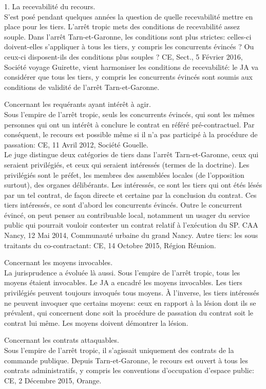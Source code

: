 \documentclass[10pt, a4paper, openany]{book}
\begin{document}
1. La recevabilité du recours. \\
S'est posé pendant quelques années la question de quelle recevabilité mettre en place pour les tiers. L'arrêt tropic mets des conditions de recevabilité assez souple. Dans l'arrêt Tarn-et-Garonne, les conditions sont plus strictes: celles-ci doivent-elles s'appliquer à tous les tiers, y compris les concurrents évincés ? Ou ceux-ci disposent-ils des conditions plus souples ? CE, Sect., 5 Février 2016, Société voyage Guirette, vient harmoniser les conditions de recevabilité: le JA va considérer que tous les tiers, y compris les concurrents évincés sont soumis aux conditions de validité de l'arrêt Tarn-et-Garonne.


Concernant les requérants ayant intérêt à agir. \\
Sous l'empire de l'arrêt tropic, seuls les concurrents évincés, qui sont les mêmes personnes qui ont un intérêt à conclure le contrat en référé pré-contractuel. Par conséquent, le recours est possible même si il n'a pas participé à la procédure de passation: CE, 11 Avril 2012, Société Gouelle. \\
Le juge distingue deux catégories de tiers dans l'arrêt Tarn-et-Garonne, ceux qui seraient privilégiés, et ceux qui seraient intéressés (termes de la doctrine). Les privilégiés sont le préfet, les membres des assemblées locales (de l'opposition surtout), des organes délibérants. Les intéressés, ce sont les tiers qui ont étés lésés par un tel contrat, de façon directe et certaine par la conclusion du contrat. Ces tiers intéressés, ce sont d'abord les concurrents évincés. Outre le concurrent évincé, on peut penser au contribuable local, notamment un usager du service public qui pourrait vouloir contester un contrat relatif à l'exécution du SP. CAA Nancy, 12 Mai 2014, Communauté urbaine du grand Nancy. Autre tiers: les sous traitants du co-contractant: CE, 14 Octobre 2015, Région Réunion. 


Concernant les moyens invocables. \\
La jurisprudence a évoluée là aussi. Sous l'empire de l'arrêt tropic, tous les moyens étaient invocables. Le JA a encadré les moyens invocables. Les tiers privilégiés peuvent toujours invoqués tous moyens. À l'inverse, les tiers intéressés ne peuvent invoquer que certains moyens: ceux en rapport à la lésion dont ils se prévalent, qui concernent donc soit la procédure de passation du contrat soit le contrat lui même. Les moyens doivent démontrer la lésion. 


Concernant les contrats attaquables. \\
Sous l'empire de l'arrêt tropic, il s'agissait uniquement des contrats de la commande publique. Depuis Tarn-et-Garonne, le recours est ouvert à tous les contrats administratifs, y compris les conventions d'occupation d'espace public: CE, 2 Décembre 2015, Orange. 
\end{document}
